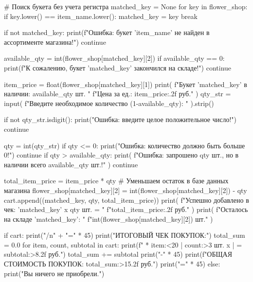 \documentclass[14pt,a4paper]{extarticle}
\begin{document}
\begin{CodeListing}
                # Поиск букета без учета регистра
                matched_key = None
                for key in flower_shop:
                    if key.lower() == item_name.lower():
                        matched_key = key
                        break

                if not matched_key:
                    print(f"Ошибка: букет '{item_name}' не найден в ассортименте магазина!")
                    continue

                available_qty = int(flower_shop[matched_key][2])
                if available_qty == 0:
                    print(f"К сожалению, букет '{matched_key}' закончился на складе!")
                    continue

                item_price = float(flower_shop[matched_key][1])
                print(
                    f"Букет '{matched_key}' в наличии: {available_qty} шт. "
                    f"Цена за ед.: {item_price:.2f} руб."
                )
                qty_str = input(
                    f"Введите необходимое количество (1-{available_qty}): "
                ).strip()

                if not qty_str.isdigit():
                    print("Ошибка: введите целое положительное число!")
                    continue

                qty = int(qty_str)
                if qty <= 0:
                    print("Ошибка: количество должно быть больше 0!")
                    continue
                if qty > available_qty:
                    print(
                        f"Ошибка: запрошено {qty} шт., но в наличии всего {available_qty} шт.!"
                    )
                    continue

                total_item_price = item_price * qty
                # Уменьшаем остаток в базе данных магазина
                flower_shop[matched_key][2] = int(flower_shop[matched_key][2]) - qty
                cart.append((matched_key, qty, total_item_price))
                print(
                    f"Успешно добавлено в чек: '{matched_key}' x {qty} шт. = "
                    f"{total_item_price:.2f} руб."
                )
                print(
                    f"Осталось на складе '{matched_key}': "
                    f"{int(flower_shop[matched_key][2])} шт."
                )

            if cart:
                print("/n" + "=" * 45)
                print("ИТОГОВЫЙ ЧЕК ПОКУПОК:")
                total_sum = 0.0
                for item, count, subtotal in cart:
                    print(f" * {item:<20} | {count:>3} шт. x | = {subtotal:>8.2f} руб.")
                    total_sum += subtotal
                print("-" * 45)
                print(f"ОБЩАЯ СТОИМОСТЬ ПОКУПОК: {total_sum:>15.2f} руб.")
                print("=" * 45)
            else:
                print("Вы ничего не приобрели.")


\end{CodeListing}
\end{document}
